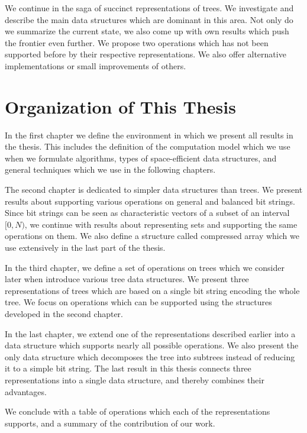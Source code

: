 \bigbreak

We continue in the saga of succinct representations of trees.
We investigate and describe the main data structures which are dominant in this area.
Not only do we summarize the current state, we also come up with own results which push the frontier even further.
We propose two operations which has not been supported before by their respective representations.
We also offer alternative implementations or small improvements of others.

\section*{Organization of This Thesis}

In the first chapter we define the environment in which we present all results in the thesis.
This includes the definition of the computation model which we use when we formulate algorithms, types of space-efficient data structures, and general techniques which we use in the following chapters.

The second chapter is dedicated to simpler data structures than trees.
We present results about supporting various operations on general and balanced bit strings.
Since bit strings can be seen as characteristic vectors of a subset of an interval $[0, N)$, we continue with results about representing sets and supporting the same operations on them.
We also define a structure called compressed array which we use extensively in the last part of the thesis.

In the third chapter, we define a set of operations on trees which we consider later when introduce various tree data structures.
We present three representations of trees which are based on a single bit string encoding the whole tree.
We focus on operations which can be supported using the structures developed in the second chapter.

In the last chapter, we extend one of the representations described earlier into a data structure which supports nearly all possible operations.
We also present the only data structure which decomposes the tree into subtrees instead of reducing it to a simple bit string.
The last result in this thesis connects three representations into a single data structure, and thereby combines their advantages.

We conclude with a table of operations which each of the representations supports, and a summary of the contribution of our work.